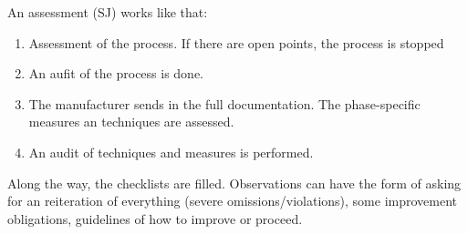 \documentclass[a4paper,german]{article}
\begin{document}
An assessment (SJ) works like that:
\begin{enumerate}
\item Assessment of the process. If there are open points, the process
  is stopped
\item An aufit of the process is done.
\item The manufacturer sends in the full documentation. The
  phase-specific measures an techniques are assessed.
\item An audit of techniques and measures is performed.
\end{enumerate}
Along the way, the checklists are filled. Observations can have the
form of asking for an reiteration of everything (severe
omissions/violations), some improvement obligations, guidelines of how
to improve or proceed. 
\end{document}
